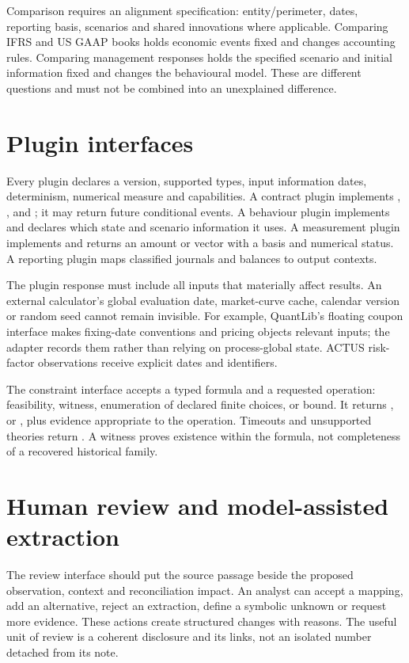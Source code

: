 Comparison requires an alignment specification: entity/perimeter, dates,
reporting basis, scenarios and shared innovations where applicable. Comparing
IFRS and US GAAP books holds economic events fixed and changes accounting
rules. Comparing management responses holds the specified scenario and
initial information fixed and changes the behavioural model. These are
different questions and must not be combined into an unexplained difference.



\section{Plugin interfaces}

Every plugin declares a version, supported types, input information dates,
determinism, numerical measure and capabilities. A contract plugin implements
, ,  and ; it may
return future conditional events. A behaviour plugin implements
 and declares which state and scenario information it uses.
A measurement plugin implements  and returns an amount or
vector with a basis and numerical status. A reporting plugin maps classified
journals and balances to output contexts.

The plugin response must include all inputs that materially affect results.
An external calculator's global evaluation date, market-curve cache, calendar
version or random seed cannot remain invisible. For example, QuantLib's
floating coupon interface makes fixing-date conventions and pricing objects
relevant inputs; the adapter records them rather than relying on process-global
state. ACTUS risk-factor observations receive explicit dates and identifiers.

The constraint interface accepts a typed formula and a requested operation:
feasibility, witness, enumeration of declared finite choices, or bound. It
returns ,  or , plus evidence appropriate
to the operation. Timeouts and unsupported theories return .
A witness proves existence within the formula, not completeness of a recovered
historical family.

\section{Human review and model-assisted extraction}

The review interface should put the source passage beside the proposed
observation, context and reconciliation impact. An analyst can accept a
mapping, add an alternative, reject an extraction, define a symbolic unknown
or request more evidence. These actions create structured changes with
reasons. The useful unit of review is a coherent disclosure and its links,
not an isolated number detached from its note.

